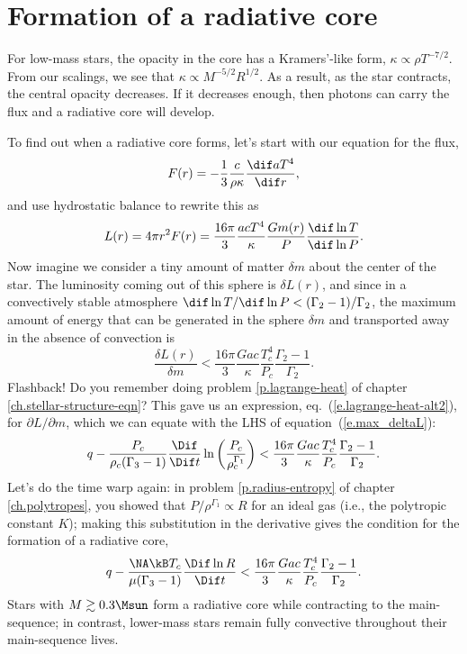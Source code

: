 \section{Formation of a radiative core}

For low-mass stars, the opacity in the core has a Kramers'-like form, $\kappa \propto \rho T^{-7/2}$. From our scalings, we see that $\kappa \propto M^{-5/2} R^{1/2}$.  As a result, as the star contracts, the central opacity decreases.  If it decreases enough, then photons can carry the flux and a radiative core will develop.

To find out when a radiative core forms, let's start with our equation for the flux,
\[ F(r) = -\frac{1}{3}\frac{c}{\rho\kappa}\frac{\dif aT^{4}}{\dif r}, \]
and use hydrostatic balance to rewrite this as
\[ L(r) = 4\pi r^{2}F(r) = \frac{16\pi}{3}  \frac{acT^{4}}{\kappa} \frac{Gm(r)}{P} \frac{\dif \ln T}{\dif \ln P}. \]
Now imagine we consider a tiny amount of matter $\delta m$ about the center of the star.  The luminosity coming out of this sphere is $\delta L(r)$,  and since in a convectively stable atmosphere $\dif\ln T/\dif\ln P < (\Gamma_{2}-1)/\Gamma_{2}$, the maximum amount of energy that can be generated in the sphere $\delta m$ and transported away in the absence of convection is
\begin{equation}\label{e.max_deltaL}
  \frac{\delta L(r)}{\delta m} < \frac{16\pi}{3} \frac{Gac}{\kappa} \frac{T_{c}^{4}}{P_{c}}  \frac{\Gamma_{2}-1}{\Gamma_{2}}.
\end{equation}
Flashback! Do you remember doing problem \ref{p.lagrange-heat} of chapter \ref{ch.stellar-structure-eqn}? This gave us an expression, eq.~(\ref{e.lagrange-heat-alt2}), for $\partial L/\partial m$, which we can equate with the LHS of equation~(\ref{e.max_deltaL}):
\[
 q - \frac{P_{c}}{\rho_{c}(\Gamma_{3}-1)}\frac{\Dif }{\Dif t}\ln\left(\frac{P_{c}}{\rho_{c}^{\Gamma_{1}}}\right) <
 	\frac{16\pi}{3} \frac{Gac}{\kappa} \frac{T_{c}^{4}}{P_{c}}  \frac{\Gamma_{2}-1}{\Gamma_{2}}.
\]
Let's do the time warp again: in problem \ref{p.radius-entropy} of chapter \ref{ch.polytropes}, you showed that $P/\rho^{\Gamma_{1}} \propto R$ for an ideal gas (i.e., the polytropic constant $K$); making this substitution in the derivative gives the condition for the formation of a radiative core,
\begin{equation}\label{e.formation-radiative-core}
q - \frac{\NA\kB T_{c}}{\mu(\Gamma_{3}-1)} \frac{\Dif \ln R}{\Dif t} < \frac{16\pi}{3} \frac{Gac}{\kappa} \frac{T_{c}^{4}}{P_{c}}  \frac{\Gamma_{2}-1}{\Gamma_{2}}.
\end{equation}
Stars with $M \gtrsim 0.3 \Msun$ form a radiative core while contracting to the main-sequence; in contrast, lower-mass stars remain fully convective throughout their main-sequence lives.

